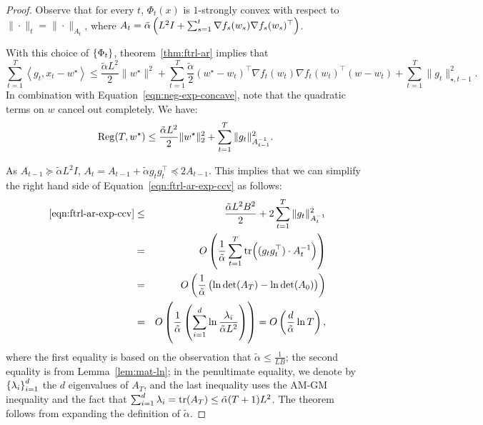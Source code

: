 \documentclass{article}
\DeclareMathOperator*{\Reg}{{\rm Reg}}
\newcommand{\inner}[2]{\left\langle #1,#2 \right\rangle}
\begin{document}
\begin{proof}
Observe that for every $t$, $\Phi_t(x)$ is $1$-strongly convex with respect to $\| \cdot \|_t = \| \cdot \|_{A_t}$, where $A_t = \tilde{\alpha} \del{L^2 I + \sum_{s=1}^t \nabla f_s(w_s) \nabla f_s(w_s)^\top}$.

With this choice of $\cbr{\Phi_t}$, theorem~\ref{thm:ftrl-ar} implies that
\[
\sum_{t=1}^T \inner{g_t}{x_t - w^\star} \leq \frac{\tilde{\alpha} L^2}2 \| w^\star\|^2 + \sum_{t=1}^T \frac{\tilde{\alpha}}{2}(w^\star - w_t)^\top \nabla f_t(w_t) \nabla f_t(w_t)^\top (w - w_t) + \sum_{t=1}^T \| g_t \|_{\star, t-1}^2.
\]
In combination with Equation~\eqref{eqn:neg-exp-concave}, note that the quadratic terms on $w$ cancel out completely.
We have:
\begin{equation}
  \Reg(T, w^\star) \leq \frac{\tilde{\alpha} L^2}2 \|w^\star\|_2^2 + \sum_{t=1}^T \| g_t \|_{A_{t-1}^{-1}}^2.
  \label{eqn:ftrl-ar-exp-ccv}
\end{equation}

As $A_{t-1} \succeq \tilde{\alpha} L^2 I$, $A_t = A_{t-1} + \tilde{\alpha} g_t g_t^\top \preceq 2 A_{t-1}$. This implies that we can simplify the right hand side of Equation~\eqref{eqn:ftrl-ar-exp-ccv} as follows:
\begin{eqnarray*}
~\eqref{eqn:ftrl-ar-exp-ccv} &\leq& \frac{\tilde{\alpha} L^2 B^2}{2} + 2 \sum_{t=1}^T \| g_t \|_{A_t^{-1}}^2 \\
&=& O \del{ \frac1{\tilde{\alpha}} \sum_{t=1}^T \tr( (g_t g_t^\top) \cdot A_t^{-1} ) } \\
&=& O \del{ \frac1{\tilde{\alpha}} \del{\ln \det( A_T ) - \ln \det (A_0)} } \\
&=& O \del{ \frac1{\tilde{\alpha}} \del{\sum_{i=1}^d \ln\frac{\lambda_i}{\tilde{\alpha} L^2}} } = O\del{ \frac{d}{\tilde{\alpha}} \ln T },
\end{eqnarray*}
where the first equality is based on the observation that $\tilde{\alpha} \leq \frac1{LB}$; the second equality is from Lemma~\ref{lem:mat-ln}; in the penultimate equality, we denote by $\cbr{\lambda_i}_{i=1}^d$ the $d$ eigenvalues of $A_T$, and the last inequality uses the AM-GM inequality and the fact that $\sum_{i=1}^d \lambda_i = \tr(A_T) \leq \tilde{\alpha}(T+1) L^2$. The theorem follows from expanding the definition of $\tilde{\alpha}$.
\end{proof}
\end{document}
